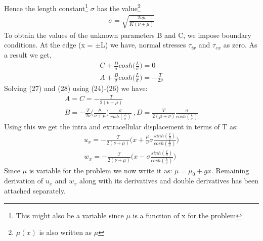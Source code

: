 \documentclass[a4paper,oneside,11pt]{report}
\begin{document}
Hence the length constant\footnote{This might also be a variable since $\mu$ is a function of x for the problem} $\sigma$ has the value\footnote{$\mu(x)$ is also written as $\mu$}
\begin{equation}
\begin{aligned}
\sigma = \sqrt{\frac{2\nu\mu}{K(\nu + \mu)}}
\end{aligned}
\end{equation}
To obtain the values of the unknown parameters B and C, we impose boundary conditions. At the edge (x = $\pm$L) we have, normal stresses $\tau_{ix}$ and $\tau_{ex}$ as zero. As a result we get,
\begin{align}
C + \frac{D}{\sigma}cosh\Big ( \frac{L}{\sigma} \Big ) = 0\\
A + \frac{B}{\sigma}cosh\Big ( \frac{L}{\sigma} \Big ) = -\frac{T}{2\nu}
\end{align} 
Solving (27) and (28) using (24)-(26) we have:
\begin{align}
A = C = -\frac{T}{2(\nu + \mu)}\\
B = -\frac{T}{2\nu}\Big ( \frac{\mu}{\nu + \mu} \Big )\frac{\sigma}{cosh(\frac{L}{\sigma})}\
, D = \frac{T}{2(\mu + \nu)}\frac{\sigma}{cosh(\frac{L}{\sigma})}
\end{align}
Using this we get the intra and extracellular displacement in terms of T as:
\begin{align}
u_x = -\frac{T}{2(\nu + \mu)} \Big ( x + \frac{\mu}{\nu} \sigma \frac{sinh(\frac{x}{\sigma})}{cosh(\frac{L}{\sigma})}\Big )\\
w_x = -\frac{T}{2(\nu + \mu)} \Big ( x - \sigma \frac{sinh(\frac{x}{\sigma})}{cosh(\frac{L}{\sigma})}\Big )
\end{align}
Since $\mu$ is variable for the problem we now write it as: $\mu = \mu_0 + gx$. Remaining derivation of $u_x$ and $w_x$ along with its derivatives and double derivatives has been attached separately. 
\newpage
\end{document}
